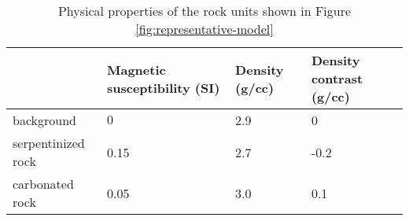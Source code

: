 \begin{table}
    \centering
        \caption{Physical properties of the rock units shown in Figure \ref{fig:representative-model}}
        \begin{tabular}[htb]{| l | p{3.7cm} | p{3.7cm}  | p{3.7cm}  |}
            \hline
             & \textbf{Magnetic susceptibility (SI)} & \textbf{Density (g/cc)} & \textbf{Density contrast (g/cc)}\\
            \hline
            background & $0$ & 2.9 & 0 \\
            serpentinized rock & 0.15 & 2.7 & -0.2 \\
            carbonated rock & 0.05 & 3.0 & 0.1 \\
            \hline
        \end{tabular}
        \label{tab:physical-properties}
     \end{table}


